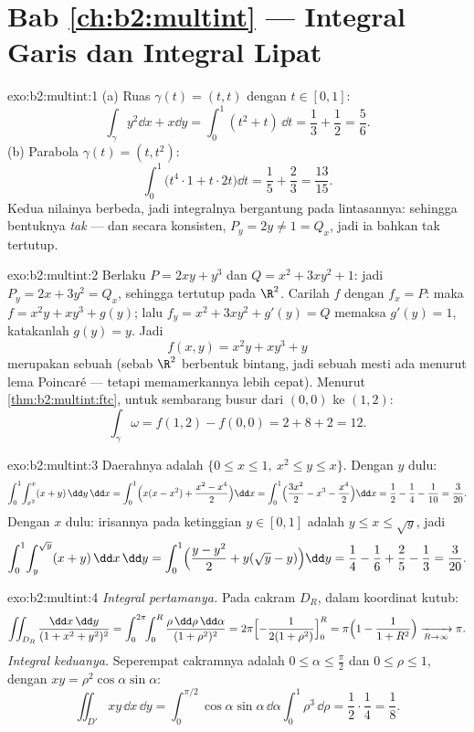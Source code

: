 \section*{Bab \ref{ch:b2:multint} --- Integral Garis dan Integral Lipat}

\begin{solution}{exo:b2:multint:1}
(a) Ruas $\gamma(t) = (t, t)$ dengan $t \in [0,1]$:
\[
\int_\gamma y^2\dd x + x\dd y
= \int_0^1 (t^2 + t)\,\dd t = \frac13 + \frac12 = \frac56 .
\]
(b) Parabola $\gamma(t) = (t, t^2)$:
\[
\int_0^1 \bigl(t^4\cdot 1 + t\cdot 2t\bigr)\dd t
= \frac15 + \frac23 = \frac{13}{15} .
\]
Kedua nilainya berbeda, jadi integralnya bergantung pada lintasannya: sehingga bentuknya
\emph{tak}  --- dan secara konsisten, $P_y = 2y \neq 1 = Q_x$, jadi
ia bahkan tak tertutup.
\end{solution}

\begin{solution}{exo:b2:multint:2}
Berlaku $P = 2xy + y^3$ dan $Q = x^2 + 3xy^2 + 1$: jadi $P_y = 2x + 3y^2 = Q_x$,
sehingga tertutup pada $\R^2$. Carilah $f$ dengan $f_x = P$: maka $f = x^2y + xy^3
+ g(y)$; lalu $f_y = x^2 + 3xy^2 + g'(y) = Q$ memaksa $g'(y) = 1$,
katakanlah $g(y) = y$. Jadi
\[
f(x, y) = x^2y + xy^3 + y
\]
merupakan sebuah  (sebab $\R^2$ berbentuk bintang, jadi sebuah  mesti
ada menurut lema Poincaré --- tetapi memamerkannya lebih cepat). Menurut
\cref{thm:b2:multint:ftc}, untuk sembarang busur dari $(0,0)$ ke $(1,2)$:
\[
\int_\gamma\omega = f(1, 2) - f(0, 0) = 2 + 8 + 2 = 12 .
\]
\end{solution}

\begin{solution}{exo:b2:multint:3}
Daerahnya adalah $\{0 \leq x \leq 1,\ x^2 \leq y \leq x\}$.
Dengan $y$ dulu:
\[
\int_0^1\!\int_{x^2}^{x}(x + y)\,\dd y\,\dd x
= \int_0^1\Bigl(x(x - x^2)
+ \frac{x^2 - x^4}{2}\Bigr)\dd x
= \int_0^1\Bigl(\frac{3x^2}{2} - x^3 - \frac{x^4}{2}\Bigr)\dd x
= \frac12 - \frac14 - \frac1{10} = \frac{3}{20} .
\]
Dengan $x$ dulu: irisannya pada ketinggian $y \in [0, 1]$ adalah $y \leq x \leq
\sqrt y$, jadi
\[
\int_0^1\!\int_{y}^{\sqrt y}(x + y)\,\dd x\,\dd y
= \int_0^1\Bigl(\frac{y - y^2}{2}
+ y(\sqrt y - y)\Bigr)\dd y
= \frac14 - \frac16 + \frac25 - \frac13 = \frac{3}{20} .
\]
\end{solution}

\begin{solution}{exo:b2:multint:4}
\emph{Integral pertamanya.} Pada cakram $D_R$, dalam koordinat kutub:
\[
\iint_{D_R}\frac{\dd x\,\dd y}{(1 + x^2 + y^2)^2}
= \int_0^{2\pi}\!\!\int_0^R
\frac{\rho\,\dd\rho\,\dd\alpha}{(1 + \rho^2)^2}
= 2\pi\Bigl[-\frac{1}{2(1 + \rho^2)}\Bigr]_0^R
= \pi\Bigl(1 - \frac{1}{1 + R^2}\Bigr)
\xrightarrow[R \to \infty]{} \pi .
\]
\emph{Integral keduanya.} Seperempat cakramnya adalah $0 \leq \alpha \leq
\frac\pi2$ dan $0 \leq \rho \leq 1$, dengan $xy =
\rho^2\cos\alpha\sin\alpha$:
\[
\iint_{D'}xy\,\dd x\,\dd y
= \int_0^{\pi/2}\!\!\cos\alpha\sin\alpha\,\dd\alpha
\int_0^1 \rho^3\,\dd\rho
= \frac12\cdot\frac14 = \frac18 .
\]
\end{solution}

